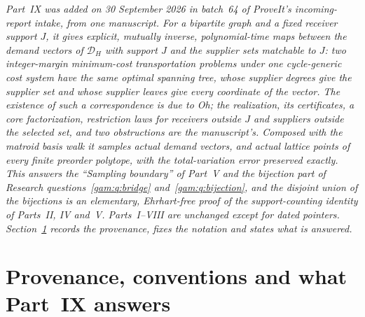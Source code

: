 \documentclass[11pt]{article}
\numberwithin{equation}{section}
\theoremstyle{definition}
\newcommand{\cD}{\mathcal D}
\begin{document}
\noindent\emph{Part~IX was added on 30 September 2026 in batch~64 of
ProveIt's incoming-report intake, from one manuscript. For a bipartite
graph and a fixed receiver support $J$, it gives explicit, mutually
inverse, polynomial-time maps between the demand vectors of $\cD_H$ with
support $J$ and the supplier sets matchable to $J$: two integer-margin
minimum-cost transportation problems under one cycle-generic cost system
have the same optimal spanning tree, whose supplier degrees give the
supplier set and whose supplier leaves give every coordinate of the
vector. The existence of such a correspondence is due to Oh; the
realization, its certificates, a core factorization, restriction laws for
receivers outside $J$ and suppliers outside the selected set, and two
obstructions are the manuscript's. Composed with the matroid basis walk it
samples actual demand vectors, and actual lattice points of every finite
preorder polytope, with the total-variation error preserved exactly. This
answers the ``Sampling boundary'' of Part~V and the bijection part of
Research questions~\ref{gam:q:bridge} and~\ref{gam:q:bijection}, and the
disjoint union of the bijections is an elementary, Ehrhart-free proof of
the support-counting identity of Parts~II, IV and~V. Parts~I--VIII are
unchanged except for dated pointers. Section~\ref{tf:sec:prov} records the
provenance, fixes the notation and states what is answered.}

\section{Provenance, conventions and what Part~IX answers}
\label{tf:sec:prov}
\end{document}
